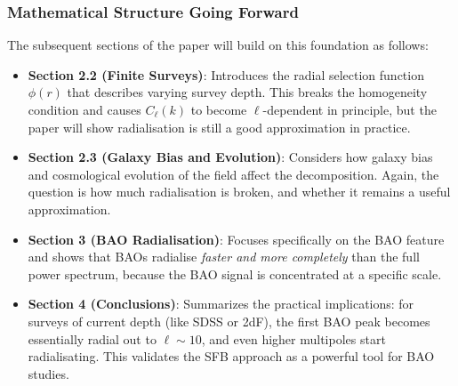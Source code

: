 \subsubsection{Mathematical Structure Going Forward}

The subsequent sections of the paper will build on this foundation as follows:

\begin{itemize}
    \item \textbf{Section 2.2 (Finite Surveys)}: Introduces the radial selection function $\phi(r)$ that describes varying survey depth. This breaks the homogeneity condition and causes $C_\ell(k)$ to become $\ell$-dependent in principle, but the paper will show radialisation is still a good approximation in practice.
    
    \item \textbf{Section 2.3 (Galaxy Bias and Evolution)}: Considers how galaxy bias and cosmological evolution of the field affect the decomposition. Again, the question is how much radialisation is broken, and whether it remains a useful approximation.
    
    \item \textbf{Section 3 (BAO Radialisation)}: Focuses specifically on the BAO feature and shows that BAOs radialise \emph{faster and more completely} than the full power spectrum, because the BAO signal is concentrated at a specific scale.
    
    \item \textbf{Section 4 (Conclusions)}: Summarizes the practical implications: for surveys of current depth (like SDSS or 2dF), the first BAO peak becomes essentially radial out to $\ell \sim 10$, and even higher multipoles start radialisating. This validates the SFB approach as a powerful tool for BAO studies.
\end{itemize}

